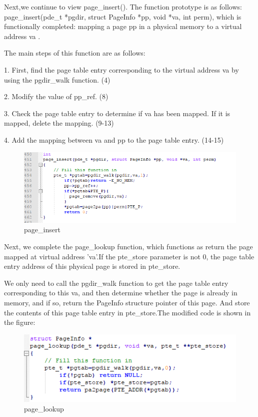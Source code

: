 Next,we continue to view page\_insert(). The function prototype is as follows: page\_insert(pde\_t *pgdir, struct PageInfo *pp, void *va, int perm), which is functionally completed: mapping a page pp in a physical memory to a virtual address va .

The main steps of this function are as follows:

1. First, find the page table entry corresponding to the virtual address va by using the pgdir\_walk function. (4)

2. Modify the value of pp\_ref. (8)

3. Check the page table entry to determine if va has been mapped. If it is mapped, delete the mapping. (9-13)

4. Add the mapping between va and pp to the page table entry. (14-15)

\begin{figure}[H]
\centering
\includegraphics[width=0.8\linewidth]{figure/page_insert_changed}
\caption{page\_insert}
\end{figure}

Next, we complete the page\_lookup function, which functions as return the page mapped at virtual address 'va'.If the pte\_store parameter is not 0, the page table entry address of this physical page is stored in pte\_store.

We only need to call the pgdir\_walk function to get the page table entry corresponding to this va, and then determine whether the page is already in memory, and if so, return the PageInfo structure pointer of this page. And store the contents of this page table entry in pte\_store.The modified code is shown in the figure:
\begin{figure}[H]
\centering
\includegraphics[width=0.8\linewidth]{figure/page_lookup_changed}
\caption{page\_lookup}
\end{figure}

